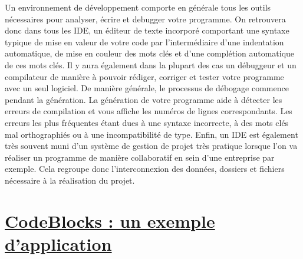 \documentclass[a4paper, 12pt]{article}
\begin{document}
\begin{doublespace}
Un environnement de développement comporte en générale tous les outils nécessaires pour analyser, écrire et debugger votre programme. On retrouvera donc dans tous les IDE, un éditeur de texte incorporé comportant une syntaxe typique de mise en valeur de votre code par l'intermédiaire d'une indentation automatique, de mise en couleur des mots clés et d'une complétion automatique de ces mots clés. Il y aura également dans la plupart des cas un débuggeur et un compilateur de manière à pouvoir rédiger, corriger et tester votre programme avec un seul logiciel. De manière générale, le processus de débogage commence pendant la génération. La génération de votre programme  aide à détecter les erreurs de compilation et vous affiche les numéros de lignes correspondants. Les erreurs les plus fréquentes étant dues à une syntaxe incorrecte, à des mots clés mal orthographiés ou à une incompatibilité de type.  Enfin, un IDE est également très souvent muni d’un système de gestion de projet très pratique lorsque l’on va réaliser un programme de manière collaboratif en sein d’une entreprise par exemple. Cela regroupe donc  l’interconnexion des données, dossiers et fichiers nécessaire à la réalisation du projet.
\end{doublespace}

\newpage \section{\underline{CodeBlocks : un exemple d'application}}
\end{document}
